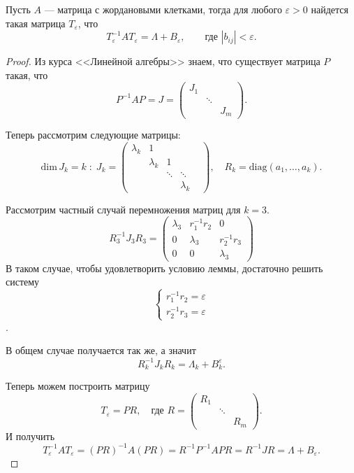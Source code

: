 \begin{lemma}
        Пусть $A$ --- матрица с жордановыми клетками, тогда для любого $\varepsilon > 0$ найдется такая матрица $T_\varepsilon$, что
$$
        T_\varepsilon^{-1} A T_\varepsilon = \Lambda + B_\varepsilon,
\qquad
        \mbox{где } |b_{ij}| < \varepsilon.
$$
\end{lemma}
\begin{proof}
        Из курса <<Линейной алгебры>> знаем, что существует матрица $P$ такая, что
$$
        P^{-1} A P = J = 
        \begin{pmatrix}
\boxed{J_1} &&\\
&\ddots&\\
&&\boxed{J_m}
        \end{pmatrix}.
$$

Теперь рассмотрим следующие матрицы:
$$
        \mbox{dim}\,J_k = k\;:\;
        J_k = \begin{pmatrix}
\lambda_k & 1 &&& \\
&\lambda_k & 1 && \\
&&\ddots&\ddots&\\

&&&\lambda_k
        \end{pmatrix},
\quad
        R_k = \mbox{diag}(a_1,\ldots,a_k).
$$
        \begin{example}
Рассмотрим частный случай перемножения матриц для $k = 3$.
$$
        R^{-1}_3 J_3 R_3 = 
        \begin{pmatrix}
\lambda_3 & r_1^{-1}r_2 & 0 \\
0 & \lambda_3 & r_2^{-1}r_3 \\
0 & 0 & \lambda_3
        \end{pmatrix}
$$
В таком случае, чтобы удовлетворить условию леммы, достаточно решить систему
$$
        \begin{cases}
r_1^{-1} r_2 = \varepsilon \\
r_2^{-1} r_3 = \varepsilon
        \end{cases}
$$.
        \end{example}

В общем случае получается так же, а значит
$$
        R_k^{-1} J_k  R_k = \Lambda_k + B_k^\varepsilon.
$$

Теперь можем построить матрицу 
$$
        T_\varepsilon = PR,
\quad
        \mbox{где }R = 
        \begin{pmatrix}
\boxed{R_1} && \\
&\ddots& \\
&&\boxed{R_m}
        \end{pmatrix}.
$$
И получить
$$
        T_\varepsilon^{-1} A T_\varepsilon
=
        (PR)^{-1} A (PR)
=
        R^{-1}P^{-1}APR
=
        R^{-1}JR
=
        \Lambda + B_\varepsilon. 
$$
\end{proof}


